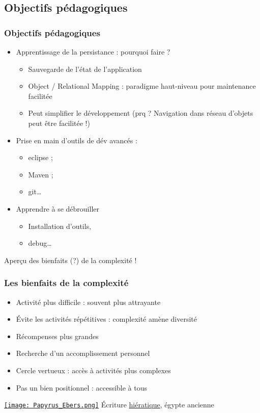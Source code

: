 \documentclass[english, french]{beamer}
\begin{document}
\subsection{Objectifs pédagogiques}
\begin{frame}
	\frametitle{Objectifs pédagogiques}
	\begin{itemize}
		\item Apprentissage de la persistance : pourquoi faire ? \pause
			\begin{itemize}
				\item Sauvegarde de l’état de l’application
				\item Object / Relational Mapping : paradigme haut-niveau pour maintenance facilitée
				\item Peut simplifier le développement (prq ? \pause Navigation dans réseau d’objets peut être facilitée !)\pause
			\end{itemize}
		\item Prise en main d’outils de dév avancés : 
			\begin{itemize}
				\item eclipse ;
				\item Maven ;
				\item git…
			\end{itemize}
		\item Apprendre à se débrouiller
			\begin{itemize}
				\item Installation d’outils,
				\item debug…
			\end{itemize}
	\end{itemize}
	Aperçu des bienfaits (?) de la complexité !
\end{frame}

\begin{frame}
	\frametitle{Les bienfaits de la complexité}
	\begin{minipage}{6cm}
		\begin{itemize}
			\item Activité plus difficile : souvent plus attrayante
			\item Évite les activités répétitives : complexité amène diversité
			\item Récompenses plus grandes
			\item Recherche d’un accomplissement personnel
			\item Cercle vertueux : accès à activités plus complexes
			\item Pas un bien positionnel : accessible à tous
		\end{itemize}
	\end{minipage}\hspace{5mm}%
	\begin{minipage}{\columnwidth-6.5cm}
		\href{https://fr.wikipedia.org/wiki/\%C3\%89criture_hi\%C3\%A9ratique}{\texttt{[image: Papyrus\_Ebers.png]}}
		\small{Écriture \href{https://en.wikipedia.org/wiki/Hieratic}{hiératique}, égypte ancienne}
	\end{minipage}
\end{frame}
\end{document}

